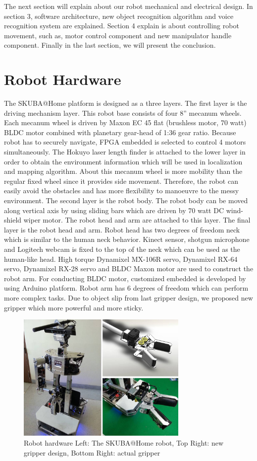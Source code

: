 \documentclass{llncs}
\begin{document}
The next section will explain about our robot mechanical and electrical design. In section 3, software architecture, new object recognition algorithm and voice recognition system are explained. Section 4 explain is about controlling robot movement, such as, motor control component and new manipulator handle component. Finally in the last section, we will present the conclusion.

\section{Robot Hardware}

The SKUBA@Home platform is designed as a three layers. The first layer is the driving mechanism layer. This robot base consists of four 8'' mecanum wheels. Each mecanum wheel is driven by Maxon EC 45 flat (brushless motor, 70 watt) BLDC motor combined with planetary gear-head of 1:36 gear ratio. Because robot has to securely navigate, FPGA embedded is selected to control 4 motors simultaneously. The Hokuyo laser length finder is attached to the lower layer in order to obtain the environment information which will be used in localization and mapping algorithm. About this mecanum wheel is more mobility than the regular fixed wheel since it provides side movement. Therefore, the robot can easily avoid the obstacles and has more flexibility to manoeuvre to the messy environment. The second layer is the robot body. The robot body can be moved along vertical axis by using sliding bars which are driven by 70 watt DC wind-shield wiper motor. The robot head and arm are attached to this layer. The final layer is the robot head and arm. Robot head has two degrees of freedom neck which is similar to the human neck behavior. Kinect sensor, shotgun microphone and Logitech webcam is fixed to the top of the neck which can be used as the human-like head. High torque Dynamixel MX-106R servo, Dynamixel RX-64 servo, Dynamixel RX-28 servo and BLDC Maxon motor are used to construct the robot arm. For conducting BLDC motor, customized embedded is developed by using Arduino platform\cite{con_arm}. Robot arm has 6 degrees of freedom which can perform more complex tasks. Due to object slip from last gripper design, we proposed new gripper which more powerful and more sticky.

\begin{figure}
\centering
\includegraphics[height=6.2cm]{robot_hardware}
\caption{Robot hardware Left: The SKUBA@Home robot, Top Right: new gripper design, Bottom Right: actual gripper}
\label{fig:base}
\end{figure}
\end{document}
